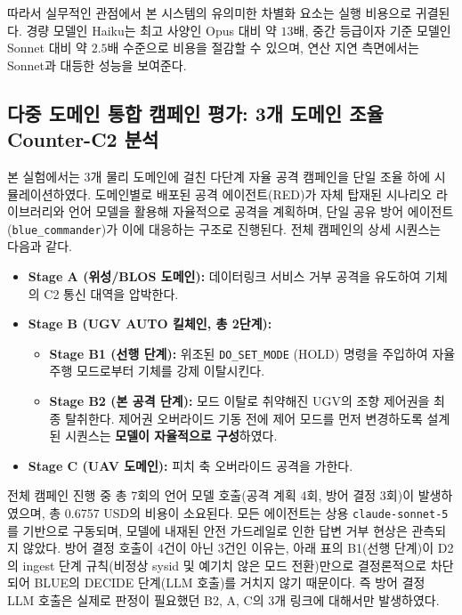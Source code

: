 따라서 실무적인 관점에서 본 시스템의 유의미한 차별화 요소는 실행 비용으로 귀결된다. 경량 모델인 Haiku는 최고 사양인 Opus 대비 약 $13$배, 중간 등급이자 기준 모델인 Sonnet 대비 약 $2.5$배 수준으로 비용을 절감할 수 있으며, 연산 지연 측면에서는 Sonnet과 대등한 성능을 보여준다.

\subsection{다중 도메인 통합 캠페인 평가: 3개 도메인 조율 Counter-C2 분석}
\label{subsec:real_game_campaign}

\noindent 
본 실험에서는 3개 물리 도메인에 걸친 다단계 자율 공격 캠페인을 단일 조율 하에 시뮬레이션하였다. 도메인별로 배포된 공격 에이전트(RED)가 자체 탑재된 시나리오 라이브러리와 언어 모델을 활용해 자율적으로 공격을 계획하며, 단일 공유 방어 에이전트(\texttt{blue\_commander})가 이에 대응하는 구조로 진행된다. 전체 캠페인의 상세 시퀀스는 다음과 같다.
\begin{itemize}
    \item \textbf{Stage A (위성/BLOS 도메인):} 데이터링크 서비스 거부 공격을 유도하여 기체의 C2 통신 대역을 압박한다.
    \item \textbf{Stage B (UGV AUTO 킬체인, 총 2단계):} 
    \begin{itemize}
        \item \textbf{Stage B1 (선행 단계):} 위조된 \texttt{DO\_SET\_MODE} (HOLD) 명령을 주입하여 자율 주행 모드로부터 기체를 강제 이탈시킨다.
        \item \textbf{Stage B2 (본 공격 단계):} 모드 이탈로 취약해진 UGV의 조향 제어권을 최종 탈취한다. 제어권 오버라이드 기동 전에 제어 모드를 먼저 변경하도록 설계된 시퀀스는 \textbf{모델이 자율적으로 구성}하였다.
    \end{itemize}
    \item \textbf{Stage C (UAV 도메인):} 피치 축 오버라이드 공격을 가한다.
\end{itemize}

전체 캠페인 진행 중 총 7회의 언어 모델 호출(공격 계획 4회, 방어 결정 3회)이 발생하였으며, 총 0.6757 USD의 비용이 소요된다. 모든 에이전트는 상용 \texttt{claude-sonnet-5}를 기반으로 구동되며, 모델에 내재된 안전 가드레일로 인한 답변 거부 현상은 관측되지 않았다. 방어 결정 호출이 4건이 아닌 3건인 이유는, 아래 표의 B1(선행 단계)이 D2의 ingest 단계 규칙(비정상 sysid 및 예기치 않은 모드 전환)만으로 결정론적으로 차단되어 BLUE의 DECIDE 단계(LLM 호출)를 거치지 않기 때문이다. 즉 방어 결정 LLM 호출은 실제로 판정이 필요했던 B2, A, C의 3개 링크에 대해서만 발생하였다.

